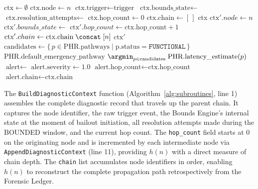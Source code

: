 \begin{algorithm}[htbp]
\caption{Subroutines supporting the escalation algorithm.}
\label{alg:subroutines}
\begin{algorithmic}[1]
  \State $\text{ctx} \leftarrow \emptyset$
  \State $\text{ctx.node} \leftarrow n$
  \State $\text{ctx.trigger} \leftarrow \text{trigger}$
  \State $\text{ctx.bounds\_state} \leftarrow$ 
  \State $\text{ctx.resolution\_attempts} \leftarrow$ 
  \State $\text{ctx.hop\_count} \leftarrow 0$
  \State $\text{ctx.chain} \leftarrow [\,]$ 
  \State \Return ctx
\EndFunction
\Statex
{}
  \State $\text{ctx}'.node \leftarrow n$
  \State $\text{ctx}'.bounds\_state \leftarrow$ 
  \State $\text{ctx}'.hop\_count \leftarrow \text{ctx.hop\_count} + 1$
  \State $\text{ctx}'.chain \leftarrow \text{ctx.chain} \;\concat\; [n]$ 
  \State \Return $\text{ctx}'$
\EndFunction
\Statex
{}
  \State {}
  \State $\text{candidates} \leftarrow \bigl\{\,p \in \text{PHR.pathways} \mid \text{p.status} = \texttt{FUNCTIONAL}\,\bigr\}$
    \State \Return $\text{PHR.default\_emergency\_pathway}$
  \EndIf
  \State \Return $\argmin_{p \in \text{candidates}} \; \text{PHR.latency\_estimate}(p)$
\EndFunction
\Statex
{}
  \State {}
  \State $\text{alert} \leftarrow$ 
  \State $\text{alert.severity} \leftarrow 1.0$ 
  \State $\text{alert.hop\_count} \leftarrow \text{ctx.hop\_count}$
  \State $\text{alert.chain} \leftarrow \text{ctx.chain}$
  \State \State {}
  \State {}
\EndProcedure
\end{algorithmic}
\end{algorithm}

The \texttt{BuildDiagnosticContext} function (Algorithm~\ref{alg:subroutines}, line 1) assembles the complete diagnostic record that travels up the parent chain. It captures the node identifier, the raw trigger event, the Bounds Engine's internal state at the moment of bailout initiation, all resolution attempts made during the BOUNDED window, and the current hop count. The \texttt{hop\_count} field starts at 0 on the originating node and is incremented by each intermediate node via \texttt{AppendDiagnosticContext} (line 11), providing $h(n)$ with a direct measure of chain depth. The \texttt{chain} list accumulates node identifiers in order, enabling $h(n)$ to reconstruct the complete propagation path retrospectively from the Forensic Ledger.

